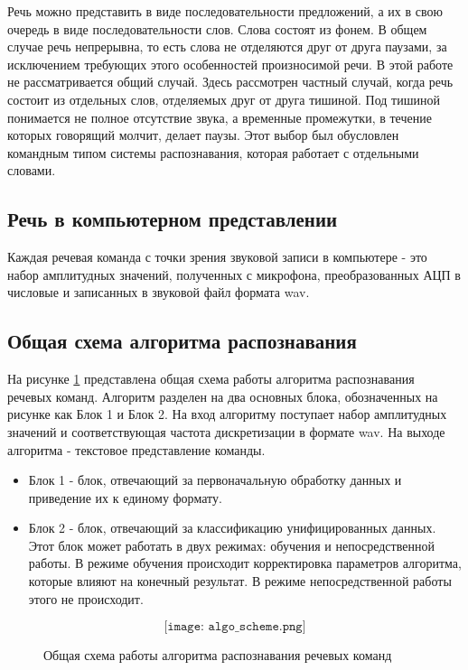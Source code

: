 Речь можно представить в виде последовательности предложений, а их в свою очередь в виде последовательности слов. Слова состоят из фонем. В общем случае речь непрерывна, то есть слова не отделяются друг от друга паузами, за исключением требующих этого особенностей произносимой речи. В этой работе не рассматривается общий случай. Здесь рассмотрен частный случай, когда речь состоит из отдельных слов, отделяемых друг от друга тишиной. Под тишиной понимается не полное отсутствие звука, а временные промежутки, в течение которых говорящий молчит, делает паузы. Этот выбор был обусловлен командным типом системы распознавания, которая работает с отдельными словами.

\subsection{Речь в компьютерном представлении}
Каждая речевая команда с точки зрения звуковой записи в компьютере - это набор амплитудных значений, полученных с микрофона, преобразованных АЦП в числовые и записанных в звуковой файл формата wav.

\subsection{Общая схема алгоритма распознавания}
На рисунке \ref{fig:algo_scheme} представлена общая схема работы алгоритма распознавания речевых команд. Алгоритм разделен на два основных блока, обозначенных на рисунке как Блок 1 и Блок 2. На вход алгоритму поступает набор амплитудных значений и соответствующая частота дискретизации в формате wav. На выходе алгоритма - текстовое представление команды.

\begin{itemize}[leftmargin=2cm]
\item Блок 1 - блок, отвечающий за первоначальную обработку данных и приведение их к единому формату. 
\item Блок 2 - блок, отвечающий за классификацию унифицированных данных. Этот блок может работать в двух режимах: обучения и непосредственной работы. В режиме обучения происходит корректировка параметров алгоритма, которые влияют на конечный результат. В режиме непосредственной работы этого не происходит.
\end{itemize}

\begin{figure}[H]
  \[\texttt{[image: algo\_scheme.png]}\]
  \caption{Общая схема работы алгоритма распознавания речевых команд}
  \label{fig:algo_scheme}
\end{figure}